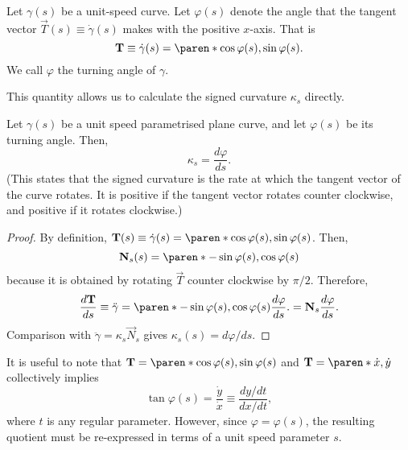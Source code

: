 \documentclass[11pt]{penrose}
\newcommand{\vT}{\vec{T}}
\newcommand{\vN}{\vec{N}}
\newcommand{\keyword}[1]{\textsf{#1}}
\begin{document}
\begin{ndfn}
    Let $\gamma(s)$ be a unit-speed curve. Let $\varphi(s)$ denote the angle that the tangent vector $\vT(s) \equiv \dot{\gamma}(s)$ makes with the positive $x$-axis. That is
    \begin{equation}
        \vT \equiv \dot{\gamma}(s) = \paren*{\cos\varphi(s), \sin\varphi(s)}.
    \end{equation}
    We call $\varphi$ the \keyword{turning angle} of $\gamma$.
\end{ndfn}

This quantity allows us to calculate the signed curvature $\kappa_s$ directly.

\begin{nprop}
    Let $\gamma(s)$ be a unit speed parametrised plane curve, and let $\varphi(s)$ be its turning angle. Then,
    \begin{equation*}
        \kappa_s = \frac{d\varphi}{ds}.
    \end{equation*}
    (This states that the signed curvature is the rate at which the tangent vector of the curve rotates. It is positive if the tangent vector rotates counter clockwise, and positive if it rotates clockwise.)
\end{nprop}
\begin{proof}
    By definition, $\vT(s) \equiv \dot{\gamma}(s) = \paren*{\cos\varphi(s), \sin\varphi(s)}$. Then,
    \begin{equation}
        \vN_s(s) = \paren*{-\sin\varphi(s), \cos\varphi(s)}
    \end{equation}
    because it is obtained by rotating $\vT$ counter clockwise by $\pi/2$. Therefore,
    \begin{equation}
        \frac{d\vT}{ds} \equiv \ddot{\gamma}
        = \paren*{-\sin\varphi(s), \cos\varphi(s)} \frac{d\varphi}{ds}.
        = \vN_s \frac{d\varphi}{ds}.
    \end{equation}
    Comparison with $\ddot{\gamma} = \kappa_s \vN_s$ gives $\kappa_s(s) = d\varphi/ds$.
\end{proof}

It is useful to note that $\vT = \paren*{\cos\varphi(s), \sin\varphi(s)}$ and $\vT = \paren*{\dot{x}, \dot{y}}$ collectively implies
\begin{equation}
    \tan\varphi(s) = \frac{\dot{y}}{\dot{x}} \equiv \frac{dy/dt}{dx/dt},
\end{equation}
where $t$ is any regular parameter. However, since $\varphi = \varphi(s)$, the resulting quotient must be re-expressed in terms of a unit speed parameter $s$.
\end{document}
